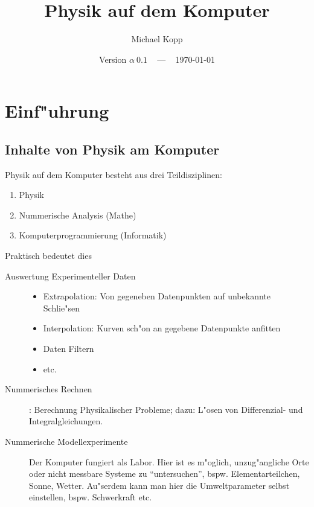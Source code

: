 \documentclass[a4paper]{book}
\title{Physik auf dem Komputer}
\author{Michael Kopp}
\date{Version $\alpha ~ 0.1$ ~ --- ~ \today}
\begin{document}
\frontmatter


\maketitle


\tableofcontents


\sloppy





\mainmatter


\chapter{Einf"uhrung}
\label{cha:einfuhrung}


\section{Inhalte von Physik am Komputer}
\label{sec:inhalte_von_physik_am_komputer}



Physik auf dem Komputer besteht aus drei Teildisziplinen:
\begin{enumerate}
\item Physik
\item Nummerische Analysis (Mathe)
\item Komputerprogrammierung (Informatik)
\end{enumerate}

Praktisch bedeutet dies
\begin{description}
\item[Auswertung Experimenteller Daten]
  \begin{itemize}
  \item Extrapolation: Von gegeneben Datenpunkten auf unbekannte Schlie"sen
  \item Interpolation: Kurven sch"on an gegebene Datenpunkte anfitten
  \item Daten Filtern
  \item etc.
  \end{itemize}
\item[Nummerisches Rechnen] : Berechnung Physikalischer Probleme;
  dazu: L"osen von Differenzial- und Integralgleichungen.
\item[Nummerische Modellexperimente] Der Komputer fungiert als
  Labor. Hier ist es m"oglich, unzug"angliche Orte oder nicht messbare
  Systeme zu "`untersuchen"', bspw. Elementarteilchen, Sonne,
  Wetter. Au"serdem kann man hier die Umweltparameter selbst
  einstellen, bspw. Schwerkraft etc.
\end{description}
\end{document}
